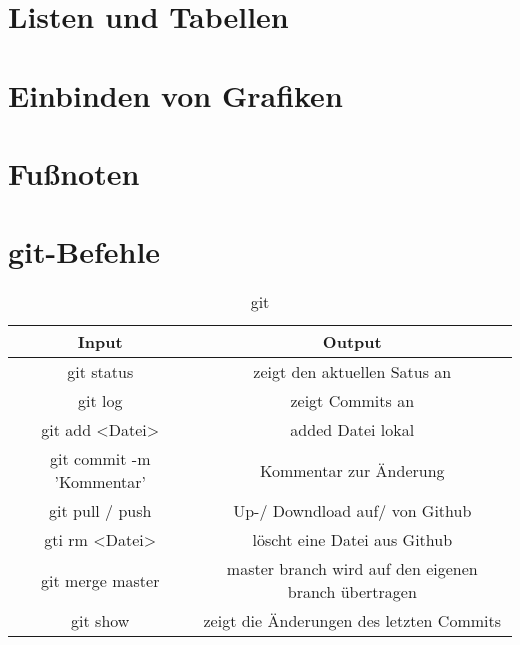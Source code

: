 \documentclass[titlepage=firstiscover]{scrartcl}
\begin{document}
\section{Listen und Tabellen}
\section{Einbinden von Grafiken}
\section{Fußnoten}

\section{git-Befehle}
\begin{table}
  \centering
  \caption{git}
  \label{tab:git}
    \begin{tabular} {c c}
      \toprule %
      Input & Output
      \\
      \midrule
       git status & zeigt den aktuellen Satus an \\
       git log & zeigt Commits an \\
       git add <Datei> & added Datei lokal \\
       git commit -m 'Kommentar' & Kommentar zur Änderung \\
       git pull / push & Up-/ Downdload auf/ von Github \\
       gti rm <Datei> & löscht eine Datei aus Github \\
       git merge master & master branch wird auf den eigenen branch übertragen \\
       git show & zeigt die Änderungen des letzten Commits \\
      \bottomrule
    \end{tabular}
  \end{table}

  \newpage
\end{document}

